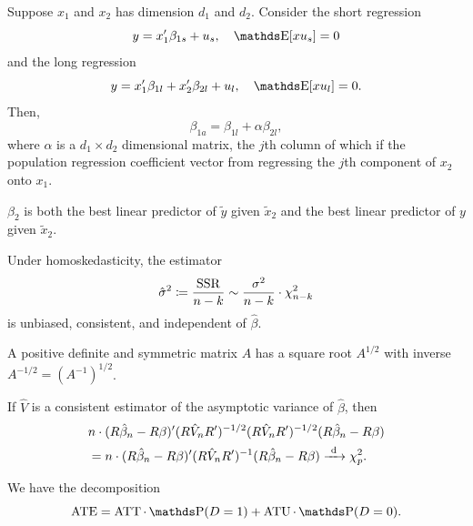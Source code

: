 \begin{proposition}
  Suppose \(x_{1}\) and \(x_{2}\) has dimension \(d_1\) and \(d_2\).
  Consider the short regression
  \[
    y = x_{1}' \beta_{1 s} + u_s, \quad \E[xu_s] = 0
  \]
  and the long regression
  \[
    y = x_{1}' \beta_{1 l} + x_{2}' \beta_{2 l} + u_l, \quad \E[xu_l] = 0.
  \]
  Then,
  \[
    \beta_{1 a} = \beta_{1 l} + \alpha \beta_{2 l},
  \]
  where \(\alpha\) is a \(d_1 \times d_2\) dimensional matrix, the \(j\)th column of which if the population regression coefficient vector from regressing the \(j\)th component of \(x_{2}\) onto \(x_{1}\).
\end{proposition}

\begin{theorem}
  \(\beta_2\) is both the best linear predictor of \(\tilde{y}\) given \(\tilde{x}_2\) and the best linear predictor of \(y\) given \(\tilde{x}_2\).
\end{theorem}

\begin{proposition}
  Under homoskedasticity, the estimator
  \[
    \hat{\sigma}^2
    \coloneqq \frac{\operatorname{SSR}}{n - k}
    \sim \frac{\sigma^2}{n - k} \cdot \chi_{n - k}^2
  \]
  is unbiased, consistent, and independent of \(\hat{\beta}\).
\end{proposition}

\begin{proposition}
  A positive definite and symmetric matrix \(A\) has a square root \(A^{1 / 2}\) with inverse \(A^{-1 / 2} = (A^{-1})^{1 / 2}\).
\end{proposition}

\begin{proposition}
  If \(\hat{V}\) is a consistent estimator of the asymptotic variance of \(\hat{\beta}\), then
  \begin{align*}
    &n \cdot (R \hat{\beta}_n - R \beta)' (R \hat{V}_n R')^{- 1 / 2} 
    (R \hat{V}_n R')^{- 1 / 2} (R \hat{\beta}_n - R \beta) \\
    &= n \cdot (R \hat{\beta}_n - R \beta)' (R \hat{V}_n R')^{-1} (R \hat{\beta}_n - R \beta)
    \xrightarrow{\ \mathrm{d}\ } \chi_p^2.
  \end{align*}
\end{proposition}

\begin{proposition}
  We have the decomposition
  \[
    \ATE
    = \ATT \cdot \P(D = 1) + \ATU \cdot \P(D = 0).
  \]
\end{proposition}

